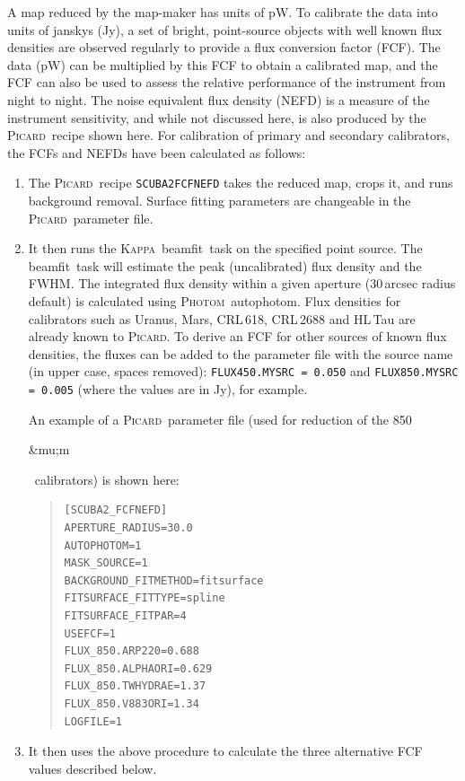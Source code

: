 \documentclass[twoside,11pt]{article}
\newcommand{\micron}{\mbox{\,${\umu}$m}}            %
\newcounter{box}
\newcommand{\xref}[3]{#1}
\renewcommand{\_}{\texttt{\symbol{95}}}
\newenvironment{myquote}{\begin{quote}\begin{small}}{\end{small}\end{quote}}
\newcommand{\Kappa}{\xref{\textsc{Kappa}}{sun95}{}}
\newcommand{\picard}{\xref{\textsc{Picard}}{sun231}{}}
\newcommand{\photom}{\xref{\textsc{Photom}}{sun45}{}}
\newcommand{\drrecipe}[1]{\texttt{#1}}
\newcommand{\task}[1]{\textsf{#1}}
\newcommand{\beamfit}{\xref{\task{beamfit}}{sun95}{BEAMFIT}}
\newcommand{\autophotom}{\xref{\task{autophotom}}{sun45}{AUTOPHOTOM}}
\renewcommand{\micron}{\begin{rawhtml}&mu;m\end{rawhtml}}
\begin{document}
A map reduced by the map-maker has units of pW. To calibrate the data
into units of janskys (Jy), a set of bright, point-source objects with
well known flux densities are observed regularly to provide a flux
conversion factor (FCF). The data (pW) can be multiplied by this FCF
to obtain a calibrated map, and the FCF can also be used to assess the
relative performance of the instrument from night to night. The noise
equivalent flux density (NEFD) is a measure of the instrument
sensitivity, and while not discussed here, is also produced by the
\picard\ recipe shown here. For calibration of primary and secondary
calibrators, the FCFs and NEFDs have been calculated as follows:
\begin{enumerate}
\item{The \picard\ recipe \drrecipe{SCUBA2\_FCFNEFD} takes the reduced
  map, crops it, and runs background removal. Surface fitting
  parameters are changeable in the \picard\ parameter file.}
\item{It then runs the \Kappa\ \beamfit\ task on the specified point
  source. The \beamfit\ task will estimate the peak (uncalibrated)
  flux density and the FWHM. The integrated flux density within a
  given aperture (30\,arcsec radius default) is calculated using
  \photom\ \autophotom. Flux densities for calibrators such as Uranus,
  Mars, CRL\,618, CRL\,2688 and HL\,Tau are already known to
  \picard. To derive an FCF for other sources of known flux densities,
  the fluxes can be added to the parameter file with the source name
  (in upper case, spaces removed): \texttt{FLUX\_450.MYSRC = 0.050}
  and \texttt{FLUX\_850.MYSRC = 0.005} (where the values are in Jy),
  for example. }

  An example of a \picard\ parameter file (used for reduction of the
  850\micron\ calibrators) is shown here:

\begin{myquote}
\begin{verbatim}
[SCUBA2_FCFNEFD]
APERTURE_RADIUS=30.0
AUTOPHOTOM=1
MASK_SOURCE=1
BACKGROUND_FITMETHOD=fitsurface
FITSURFACE_FITTYPE=spline
FITSURFACE_FITPAR=4
USEFCF=1
FLUX_850.ARP220=0.688
FLUX_850.ALPHAORI=0.629
FLUX_850.TWHYDRAE=1.37
FLUX_850.V883ORI=1.34
LOGFILE=1
\end{verbatim}
\end{myquote}

\item {It then uses the above procedure to calculate the three
  alternative FCF values described below.}
\end{enumerate}
\end{document}
